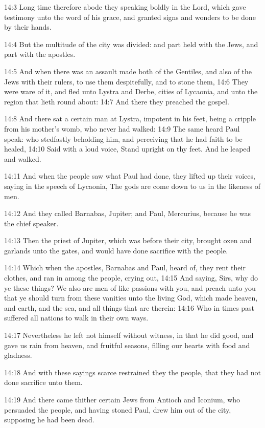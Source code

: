 14:3 Long time therefore abode they speaking boldly in the Lord, which gave testimony unto the word of his grace, and granted signs and wonders to be done by their hands.

14:4 But the multitude of the city was divided: and part held with the Jews, and part with the apostles.

14:5 And when there was an assault made both of the Gentiles, and also of the Jews with their rulers, to use them despitefully, and to stone them, 14:6 They were ware of it, and fled unto Lystra and Derbe, cities of Lycaonia, and unto the region that lieth round about: 14:7 And there they preached the gospel.

14:8 And there sat a certain man at Lystra, impotent in his feet, being a cripple from his mother's womb, who never had walked: 14:9 The same heard Paul speak: who stedfastly beholding him, and perceiving that he had faith to be healed, 14:10 Said with a loud voice, Stand upright on thy feet. And he leaped and walked.

14:11 And when the people saw what Paul had done, they lifted up their voices, saying in the speech of Lycaonia, The gods are come down to us in the likeness of men.

14:12 And they called Barnabas, Jupiter; and Paul, Mercurius, because he was the chief speaker.

14:13 Then the priest of Jupiter, which was before their city, brought oxen and garlands unto the gates, and would have done sacrifice with the people.

14:14 Which when the apostles, Barnabas and Paul, heard of, they rent their clothes, and ran in among the people, crying out, 14:15 And saying, Sirs, why do ye these things? We also are men of like passions with you, and preach unto you that ye should turn from these vanities unto the living God, which made heaven, and earth, and the sea, and all things that are therein: 14:16 Who in times past suffered all nations to walk in their own ways.

14:17 Nevertheless he left not himself without witness, in that he did good, and gave us rain from heaven, and fruitful seasons, filling our hearts with food and gladness.

14:18 And with these sayings scarce restrained they the people, that they had not done sacrifice unto them.

14:19 And there came thither certain Jews from Antioch and Iconium, who persuaded the people, and having stoned Paul, drew him out of the city, supposing he had been dead.

